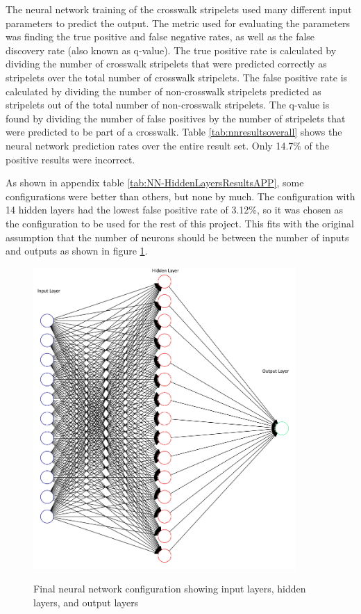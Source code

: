 \documentclass[12pt]{ucthesis}
\newcommand{\captionfonts}{\small\bf\ssp}
\begin{document}
The neural network training of the crosswalk stripelets used many different input parameters to predict the output. The metric used for evaluating the parameters was finding the true positive and false negative rates, as well as the false discovery rate (also known as q-value). The true positive rate is calculated by dividing the number of crosswalk stripelets that were predicted correctly as stripelets over the total number of crosswalk stripelets. The false positive rate is calculated by dividing the number of non-crosswalk stripelets predicted as stripelets out of the total number of non-crosswalk stripelets. The q-value is found by dividing the number of false positives by the number of stripelets that were predicted to be part of a crosswalk. Table \ref{tab:nnresultsoverall} shows the neural network prediction rates over the entire result set. Only 14.7\% of the positive results were incorrect. 


As shown in appendix table \ref{tab:NN-HiddenLayersResultsAPP}, some configurations were better than others, but none by much. The configuration with 14 hidden layers had the lowest false positive rate of 3.12\%, so it was chosen as the configuration to be used for the rest of this project. This fits with the original assumption that the number of neurons should be between the number of inputs and outputs as shown in figure \ref{fig:Neural1png}. 

\begin{figure}[t]
\begin{center}
\includegraphics[width=10cm]{ChosenNN2.png}
\captionfonts
\caption[Final Neural Network Configuration]{Final neural network configuration showing input layers, hidden layers, and output layers}
\label{fig:Neural1png}
\end{center}
\end{figure}
\end{document}

